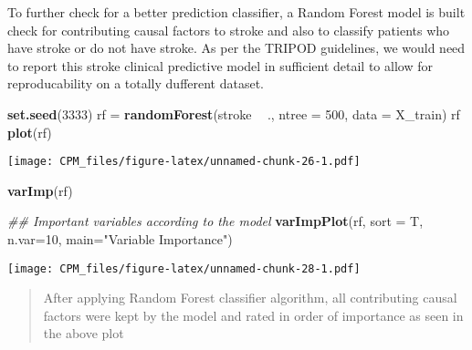 \documentclass[]{article}
\newenvironment{Shaded}{\begin{snugshade}}{\end{snugshade}}
\newcommand{\CommentTok}[1]{\textcolor[rgb]{0.56,0.35,0.01}{\textit{#1}}}
\newcommand{\DataTypeTok}[1]{\textcolor[rgb]{0.13,0.29,0.53}{#1}}
\newcommand{\DecValTok}[1]{\textcolor[rgb]{0.00,0.00,0.81}{#1}}
\newcommand{\KeywordTok}[1]{\textcolor[rgb]{0.13,0.29,0.53}{\textbf{#1}}}
\newcommand{\NormalTok}[1]{#1}
\newcommand{\OperatorTok}[1]{\textcolor[rgb]{0.81,0.36,0.00}{\textbf{#1}}}
\newcommand{\StringTok}[1]{\textcolor[rgb]{0.31,0.60,0.02}{#1}}
\begin{document}
To further check for a better prediction classifier, a Random Forest
model is built check for contributing causal factors to stroke and also
to classify patients who have stroke or do not have stroke. As per the
TRIPOD guidelines, we would need to report this stroke clinical
predictive model in sufficient detail to allow for reproducability on a
totally dufferent dataset.

\begin{Shaded}
\begin{Highlighting}[]
\KeywordTok{set.seed}\NormalTok{(}\DecValTok{3333}\NormalTok{)}
\NormalTok{rf =}\StringTok{ }\KeywordTok{randomForest}\NormalTok{(stroke }\OperatorTok{~}\StringTok{ }\NormalTok{., }
                  \DataTypeTok{ntree =} \DecValTok{500}\NormalTok{,}
                   \DataTypeTok{data =}\NormalTok{ X_train)}
\NormalTok{rf}
\KeywordTok{plot}\NormalTok{(rf) }
\end{Highlighting}
\end{Shaded}

\texttt{[image: CPM\_files/figure-latex/unnamed-chunk-26-1.pdf]}

\begin{Shaded}
\begin{Highlighting}[]
\KeywordTok{varImp}\NormalTok{(rf)}
\end{Highlighting}
\end{Shaded}

\begin{Shaded}
\begin{Highlighting}[]
\CommentTok{## Important variables according to the model}
\KeywordTok{varImpPlot}\NormalTok{(rf,  }
           \DataTypeTok{sort =}\NormalTok{ T,}
           \DataTypeTok{n.var=}\DecValTok{10}\NormalTok{,}
           \DataTypeTok{main=}\StringTok{"Variable Importance"}\NormalTok{)}
\end{Highlighting}
\end{Shaded}

\texttt{[image: CPM\_files/figure-latex/unnamed-chunk-28-1.pdf]}

\begin{quote}
After applying Random Forest classifier algorithm, all contributing
causal factors were kept by the model and rated in order of importance
as seen in the above plot
\end{quote}

\begin{Shaded}
\end{Shaded}
\end{document}
